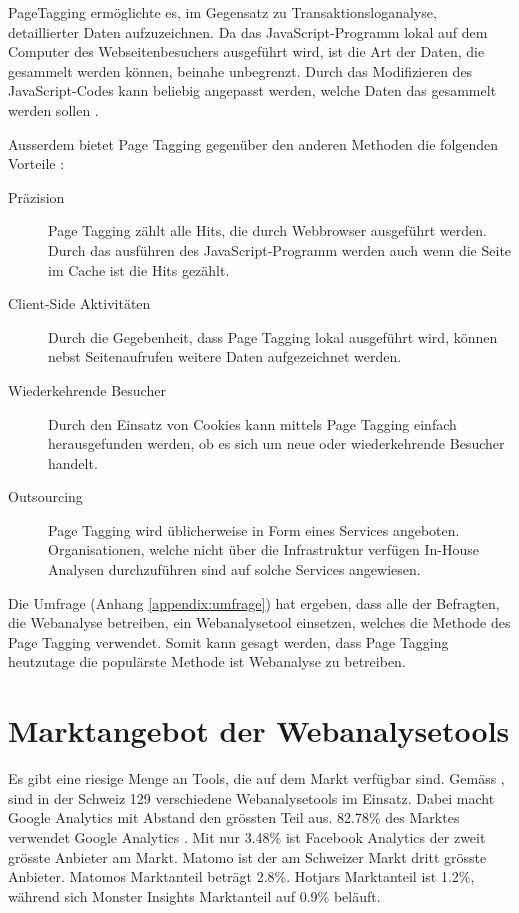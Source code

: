 PageTagging ermöglichte es, im Gegensatz zu Transaktionsloganalyse, detaillierter Daten aufzuzeichnen. Da das JavaScript-Programm lokal auf dem Computer des Webseitenbesuchers ausgeführt wird, ist die Art der Daten, die gesammelt werden können, beinahe unbegrenzt. Durch das Modifizieren des JavaScript-Codes kann beliebig angepasst werden, welche Daten das gesammelt werden sollen \parencite[S. 3]{waisberg2009webShort}. 

Ausserdem bietet Page Tagging gegenüber den anderen Methoden die folgenden Vorteile \parencite[S. 174]{nakatani2011toolselectionmethod}:

\begin{description}
  \item[Präzision] Page Tagging zählt alle Hits, die durch Webbrowser ausgeführt werden. Durch das ausführen des JavaScript-Programm werden auch wenn die Seite im Cache ist die Hits gezählt.
  \item[Client-Side Aktivitäten] Durch die Gegebenheit, dass Page Tagging lokal ausgeführt wird, können nebst Seitenaufrufen weitere Daten aufgezeichnet werden.
  \item[Wiederkehrende Besucher] Durch den Einsatz von Cookies kann mittels Page Tagging einfach herausgefunden werden, ob es sich um neue oder wiederkehrende Besucher handelt.
  \item[Outsourcing] Page Tagging wird üblicherweise in Form eines Services angeboten. Organisationen, welche nicht über die Infrastruktur verfügen In-House Analysen durchzuführen sind auf solche Services angewiesen.
\end{description}

Die Umfrage (Anhang \ref{appendix:umfrage}) hat ergeben, dass alle der Befragten, die Webanalyse betreiben, ein Webanalysetool einsetzen, welches die Methode des Page Tagging verwendet. Somit kann gesagt werden, dass Page Tagging heutzutage die populärste Methode ist Webanalyse zu betreiben.

\newpage
\section{Marktangebot der Webanalysetools}\label{sec:marktangebotwebanalyse}
Es gibt eine riesige Menge an Tools, die auf dem Markt verfügbar sind. Gemäss \parencite{datanyzeSwitzerlandWebanalytics}, sind in der Schweiz 129 verschiedene Webanalysetools im Einsatz. Dabei macht Google Analytics mit Abstand den grössten Teil aus. 82.78\% des Marktes verwendet Google Analytics . Mit nur 3.48\% ist Facebook Analytics der zweit grösste Anbieter am Markt. Matomo ist der am Schweizer Markt dritt grösste Anbieter. Matomos Marktanteil beträgt 2.8\%. Hotjars Marktanteil ist 1.2\%, während sich Monster Insights Marktanteil auf 0.9\% beläuft. 

